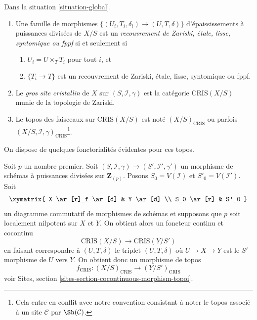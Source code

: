 \begin{definition}
\label{definition-big-crystalline-site}
Dans la situation \ref{situation-global}.
\begin{enumerate}
\item Une famille de morphismes $\{(U_i, T_i, \delta_i) \to (U, T, \delta)\}$
d'épaississements à puissances divisées de $X/S$ est un
{\it recouvrement de Zariski, étale, lisse, syntomique ou fppf}
si et seulement si
\begin{enumerate}
\item $U_i = U \times_T T_i$ pour tout $i$, et
\item $\{T_i \to T\}$ est un recouvrement de Zariski, étale, lisse, syntomique ou fppf.
\end{enumerate}
\item Le {\it gros site cristallin} de $X$ sur $(S, \mathcal{I}, \gamma)$
est la catégorie $\text{CRIS}(X/S)$ munie de la topologie de Zariski.
\item Le topos des faisceaux sur $\text{CRIS}(X/S)$ est noté
$(X/S)_{\text{CRIS}}$ ou parfois
$(X/S, \mathcal{I}, \gamma)_{\text{CRIS}}$\footnote{Cela entre en conflit avec
notre convention consistant à noter le topos associé à un site $\mathcal{C}$
par $\Sh(\mathcal{C})$.}.
\end{enumerate}
\end{definition}

\noindent
On dispose de quelques fonctorialités évidentes pour ces topos.

\begin{remark}[Fonctorialité]
\label{remark-functoriality-big-cris}
Soit $p$ un nombre premier.
Soit $(S, \mathcal{I}, \gamma) \to (S', \mathcal{I}', \gamma')$ un
morphisme de schémas à puissances divisées sur $\mathbf{Z}_{(p)}$.
Posons $S_0 = V(\mathcal{I})$ et $S'_0 = V(\mathcal{I}')$.
Soit
$$
\xymatrix{
X \ar[r]_f \ar[d] & Y \ar[d] \\
S_0 \ar[r] & S'_0
}
$$
un diagramme commutatif de morphismes de schémas et supposons que $p$ soit
localement nilpotent sur $X$ et $Y$. On obtient alors un foncteur continu et
cocontinu
$$
\text{CRIS}(X/S) \longrightarrow \text{CRIS}(Y/S')
$$
en faisant correspondre à $(U, T, \delta)$ le triplet $(U, T, \delta)$
où $U \to X \to Y$ est le $S'$-morphisme de $U$ vers $Y$.
On obtient donc un morphisme de topos
$$
f_{\text{CRIS}} : (X/S)_{\text{CRIS}} \longrightarrow (Y/S')_{\text{CRIS}}
$$
voir Sites, section \ref{sites-section-cocontinuous-morphism-topoi}.
\end{remark}

